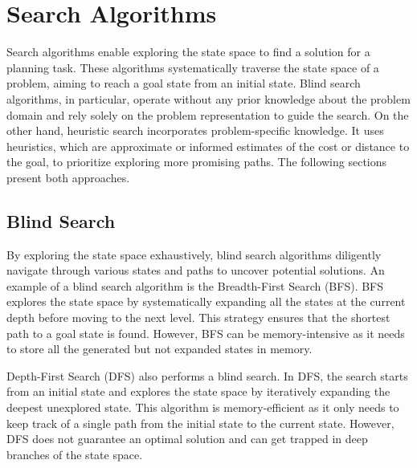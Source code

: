 \section{Search Algorithms}
\label{sec:background_searchalgorithms}

Search algorithms enable exploring the state space to find a solution for a planning task. These algorithms systematically traverse the state space of a problem, aiming to reach a goal state from an initial state. Blind search algorithms, in particular, operate without any prior knowledge about the problem domain and rely solely on the problem representation to guide the search. On the other hand, heuristic search incorporates problem-specific knowledge. It uses heuristics, which are approximate or informed estimates of the cost or distance to the goal, to prioritize exploring more promising paths. The following sections present both approaches.

\subsection{Blind Search}
\label{sec:background_blindsearch}

By exploring the state space exhaustively, blind search algorithms diligently navigate through various states and paths to uncover potential solutions. An example of a blind search algorithm is the Breadth-First Search (BFS). BFS explores the state space by systematically expanding all the states at the current depth before moving to the next level. This strategy ensures that the shortest path to a goal state is found. However, BFS can be memory-intensive as it needs to store all the generated but not expanded states in memory.

Depth-First Search (DFS) also performs a blind search. In DFS, the search starts from an initial state and explores the state space by iteratively expanding the deepest unexplored state. This algorithm is memory-efficient as it only needs to keep track of a single path from the initial state to the current state. However, DFS does not guarantee an optimal solution and can get trapped in deep branches of the state space.

